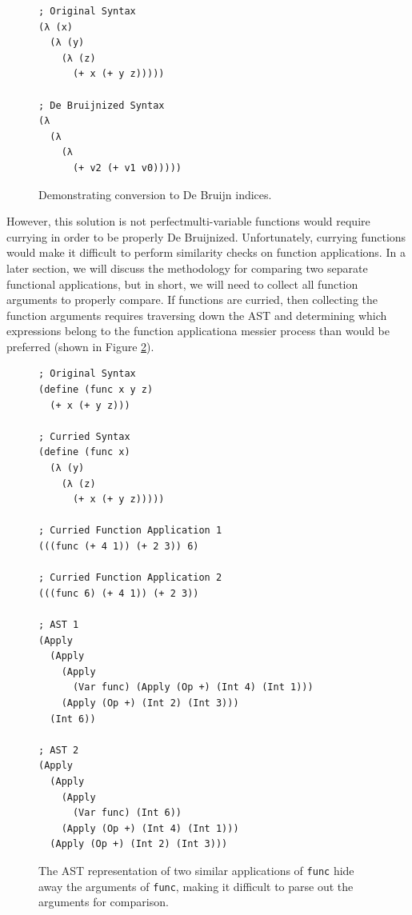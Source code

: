 \documentclass[12pt]{article}
\newcommand{\key}[1]{\texttt{#1}}
\begin{document}
\begin{figure}[H]
  \begin{mdframed}
    \begin{verbatim}
; Original Syntax
(λ (x)
  (λ (y)
    (λ (z)
      (+ x (+ y z)))))

; De Bruijnized Syntax
(λ
  (λ 
    (λ 
      (+ v2 (+ v1 v0)))))
    \end{verbatim}
  \end{mdframed}
  \caption{Demonstrating conversion to De Bruijn indices.}
  \label{debruijn}
\end{figure}

However, this solution is not perfect\textemdash multi-variable functions would require currying in order to be properly De Bruijnized. Unfortunately, currying functions would make it difficult to perform similarity checks on function applications. In a later section, we will discuss the methodology for comparing two separate functional applications, but in short, we will need to collect all function arguments to properly compare. If functions are curried, then collecting the function arguments requires traversing down the AST and determining which expressions belong to the function application\textemdash a messier process than would be preferred (shown in Figure \ref{curried-ast}).

\hfill

\begin{figure}[H]
  \begin{mdframed}
    \begin{verbatim}
; Original Syntax
(define (func x y z)
  (+ x (+ y z)))

; Curried Syntax
(define (func x)
  (λ (y)
    (λ (z)
      (+ x (+ y z)))))

; Curried Function Application 1
(((func (+ 4 1)) (+ 2 3)) 6)

; Curried Function Application 2
(((func 6) (+ 4 1)) (+ 2 3))

; AST 1
(Apply
  (Apply
    (Apply
      (Var func) (Apply (Op +) (Int 4) (Int 1)))
    (Apply (Op +) (Int 2) (Int 3)))
  (Int 6))

; AST 2
(Apply
  (Apply
    (Apply
      (Var func) (Int 6))
    (Apply (Op +) (Int 4) (Int 1)))
  (Apply (Op +) (Int 2) (Int 3)))
    \end{verbatim}
  \end{mdframed}
  \caption{The AST representation of two similar applications of \key{func} hide away the arguments of \key{func}, making it difficult to parse out the arguments for comparison.}
  \label{curried-ast}
\end{figure}
\end{document}
